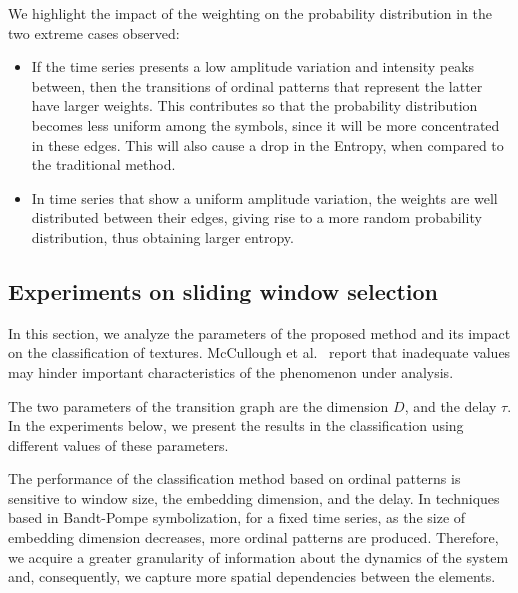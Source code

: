 \documentclass[journal]{IEEEtran}
\begin{document}
We highlight the impact of the weighting on the probability distribution in the two extreme cases observed:
\begin{itemize}
	\item If the time series presents a low amplitude variation and intensity peaks between, then the transitions of ordinal patterns that represent the latter have larger weights.
	This contributes so that the probability distribution becomes less uniform among the symbols, since it will be more concentrated in these edges.
	This will also cause a drop in the Entropy, when compared to the traditional method.
	\item In time series that show a uniform amplitude variation, the weights are well distributed between their edges, giving rise to a more random probability distribution, thus obtaining larger entropy.
\end{itemize}


\subsection{Experiments on sliding window selection}

In this section, we analyze the parameters of the proposed method and its impact on the classification of textures.
McCullough et al.~\cite{McCullough2015lagged} report that inadequate values may hinder important characteristics of the phenomenon under analysis.

The two parameters of the transition graph are the dimension $D$, and the delay $\tau$.
In the experiments below, we present the results in the classification using different values of these parameters.

The performance of the classification method based on ordinal patterns is sensitive to window size, the embedding dimension, and the delay.
In techniques based in Bandt-Pompe symbolization, for a fixed time series, as the size of embedding dimension decreases, more ordinal patterns are produced.
Therefore, we acquire a greater granularity of information about the dynamics of the system and, consequently, we capture more spatial dependencies between the elements.
\end{document}
